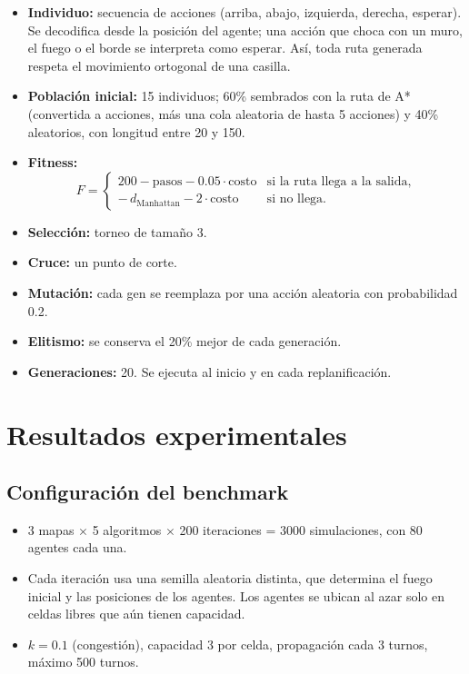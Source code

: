 \documentclass[11pt,a4paper]{article}
\begin{document}
\begin{itemize}
  \item \textbf{Individuo:} secuencia de acciones (arriba, abajo, izquierda, derecha, esperar). Se decodifica desde la posición del agente; una acción que choca con un muro, el fuego o el borde se interpreta como esperar. Así, toda ruta generada respeta el movimiento ortogonal de una casilla.
  \item \textbf{Población inicial:} 15 individuos; 60\% sembrados con la ruta de A* (convertida a acciones, más una cola aleatoria de hasta 5 acciones) y 40\% aleatorios, con longitud entre 20 y 150.
  \item \textbf{Fitness:}
  \begin{equation}
    F =
    \begin{cases}
      200 - \text{pasos} - 0.05 \cdot \text{costo} & \text{si la ruta llega a la salida},\\
      -\,d_{\text{Manhattan}} - 2 \cdot \text{costo} & \text{si no llega}.
    \end{cases}
  \end{equation}
  \item \textbf{Selección:} torneo de tamaño 3.
  \item \textbf{Cruce:} un punto de corte.
  \item \textbf{Mutación:} cada gen se reemplaza por una acción aleatoria con probabilidad 0.2.
  \item \textbf{Elitismo:} se conserva el 20\% mejor de cada generación.
  \item \textbf{Generaciones:} 20. Se ejecuta al inicio y en cada replanificación.
\end{itemize}

\section{Resultados experimentales}

\subsection{Configuración del benchmark}

\begin{itemize}
  \item 3 mapas $\times$ 5 algoritmos $\times$ 200 iteraciones = 3000 simulaciones, con 80 agentes cada una.
  \item Cada iteración usa una semilla aleatoria distinta, que determina el fuego inicial y las posiciones de los agentes. Los agentes se ubican al azar solo en celdas libres que aún tienen capacidad.
  \item $k = 0.1$ (congestión), capacidad 3 por celda, propagación cada 3 turnos, máximo 500 turnos.
\end{itemize}
\end{document}
